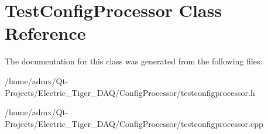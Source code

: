 \hypertarget{class_test_config_processor}{\section{Test\+Config\+Processor Class Reference}
\label{class_test_config_processor}
}


The documentation for this class was generated from the following files\+:\begin{DoxyCompactItemize}
\item 
/home/admx/\+Qt-\/\+Projects/\+Electric\+\_\+\+Tiger\+\_\+\+D\+A\+Q/\+Config\+Processor/testconfigprocessor.\+h\item 
/home/admx/\+Qt-\/\+Projects/\+Electric\+\_\+\+Tiger\+\_\+\+D\+A\+Q/\+Config\+Processor/testconfigprocessor.\+cpp\end{DoxyCompactItemize}
